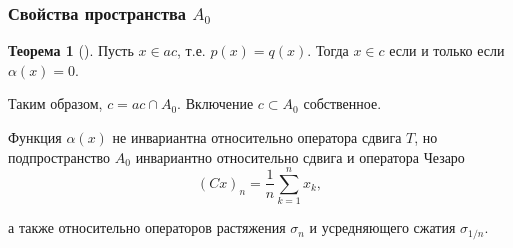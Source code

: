 \documentclass[10pt,pdf,hyperref={unicode},aspectratio=169,color={usenames, dvipsnames}]{beamer}\usepackage{amsmath}
\theoremstyle{definition}
\newtheorem{ttheorem}[llemma]{Теорема}
\begin{document}
\begin{frame}\frametitle{Свойства пространства $A_0$ }
	\begin{ttheorem}[{\cite[следствие 2]{avdeev2019space}}]
		\label{thm:alpha_c_ac_c}
		Пусть $x\in ac$, т.е. $p(x) = q(x)$.
		Тогда $x\in c$ если и только если $\alpha(x) = 0$.
	\end{ttheorem}
	Таким образом, $c = ac \cap A_0$.
	Включение $c\subset A_0$ собственное.


	Функция $\alpha(x)$ не инвариантна относительно оператора сдвига $T$,
	но подпространство $A_0$ инвариантно относительно сдвига и оператора Чезаро
	\begin{equation}
		(Cx)_n = \frac{1}{n} \sum_{k=1}^n x_k
		,
	\end{equation}

	а также относительно операторов растяжения $\sigma_n$
	и усредняющего сжатия $\sigma_{1/n}$.

\end{frame}


\def\rinc{}
\def\vak{}
\def\mzm{}

\end{document}
